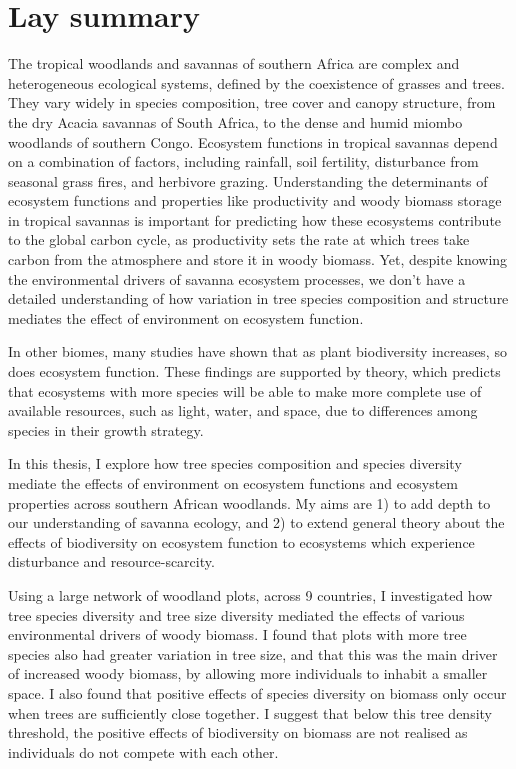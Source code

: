 \chapter*{Lay summary}
\label{lay}

The tropical woodlands and savannas of southern Africa are complex and heterogeneous ecological systems, defined by the coexistence of grasses and trees. They vary widely in species composition, tree cover and canopy structure, from the dry Acacia savannas of South Africa, to the dense and humid miombo woodlands of southern Congo. Ecosystem functions in tropical savannas depend on a combination of factors, including rainfall, soil fertility, disturbance from seasonal grass fires, and herbivore grazing. Understanding the determinants of ecosystem functions and properties like productivity and woody biomass storage in tropical savannas is important for predicting how these ecosystems contribute to the global carbon cycle, as productivity sets the rate at which trees take carbon from the atmosphere and store it in woody biomass. Yet, despite knowing the environmental drivers of savanna ecosystem processes, we don't have a detailed understanding of how variation in tree species composition and structure mediates the effect of environment on ecosystem function. 

In other biomes, many studies have shown that as plant biodiversity increases, so does ecosystem function. These findings are supported by theory, which predicts that ecosystems with more species will be able to make more complete use of available resources, such as light, water, and space, due to differences among species in their growth strategy. 

In this thesis, I explore how tree species composition and species diversity mediate the effects of environment on ecosystem functions and ecosystem properties across southern African woodlands. My aims are 1) to add depth to our understanding of savanna ecology, and 2) to extend general theory about the effects of biodiversity on ecosystem function to ecosystems which experience disturbance and resource-scarcity. 

Using a large network of woodland plots, across 9 countries, I investigated how tree species diversity and tree size diversity mediated the effects of various environmental drivers of woody biomass. I found that plots with more tree species also had greater variation in tree size, and that this was the main driver of increased woody biomass, by allowing more individuals to inhabit a smaller space. I also found that positive effects of species diversity on biomass only occur when trees are sufficiently close together. I suggest that below this tree density threshold, the positive effects of biodiversity on biomass are not realised as individuals do not compete with each other.

